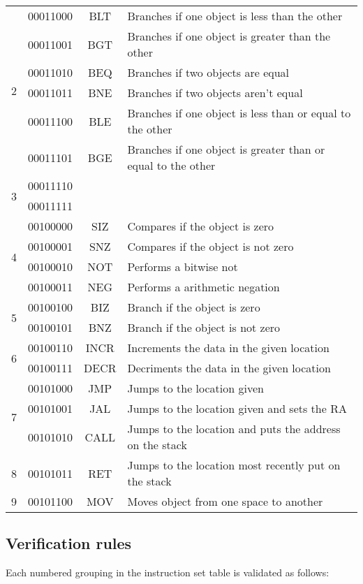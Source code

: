 \documentclass[12pt]{article}
\begin{document}
\begin{tabular}{| r | r | c | l |}
\hline
\multirow{6}{*}{2} & 00011000 & BLT & Branches if one object is less than the other\\
& 00011001 & BGT & Branches if one object is greater than the other\\
& 00011010 & BEQ & Branches if two objects are equal\\
& 00011011 & BNE & Branches if two objects aren't equal\\
& 00011100 & BLE & Branches if one object is less than or equal to the other\\
& 00011101 & BGE & Branches if one object is greater than or equal to the other\\
\hline
\multirow{2}{*}{3} & 00011110 & &\\
& 00011111 & &\\
\hline
\multirow{4}{*}{4} & 00100000 & SIZ & Compares if the object is zero\\
& 00100001 & SNZ & Compares if the object is not zero\\
& 00100010 & NOT & Performs a bitwise not\\
& 00100011 & NEG & Performs a arithmetic negation\\
\hline
\multirow{2}{*}{5} & 00100100 & BIZ & Branch if the object is zero\\
& 00100101 & BNZ & Branch if the object is not zero\\
\hline
\multirow{2}{*}{6} & 00100110 & INCR & Increments the data in the given location\\
& 00100111 & DECR & Decriments the data in the given location\\
\hline
\multirow{3}{*}{7} & 00101000 & JMP & Jumps to the location given\\
& 00101001 & JAL & Jumps to the location given and sets the RA\\
& 00101010 & CALL & Jumps to the location and puts the address on the stack\\
\hline
8 & 00101011 & RET & Jumps to the location most recently put on the stack\\
\hline
9 & 00101100 & MOV & Moves object from one space to another\\
\hline
\end{tabular}

\subsection{Verification rules}
Each numbered grouping in the instruction set table is validated as follows:
\end{document}
